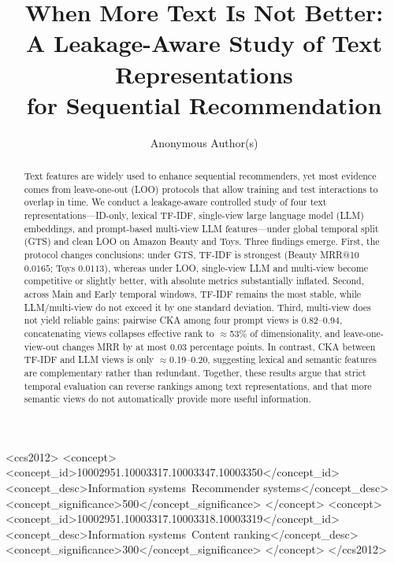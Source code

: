 \documentclass[sigconf,natbib=true,anonymous]{acmart}
\newcommand{\tfidf}{\textsc{TF-IDF}\xspace}
\newcommand{\llm}{\textsc{LLM}\xspace}
\begin{document}
\title{When More Text Is Not Better:\\
A Leakage-Aware Study of Text Representations\\
for Sequential Recommendation}

\author{Anonymous Author(s)}
\renewcommand{\shortauthors}{Anonymous}

\begin{abstract}
Text features are widely used to enhance sequential recommenders, yet most evidence comes from leave-one-out (LOO) protocols that allow training and test interactions to overlap in time.
We conduct a leakage-aware controlled study of four text representations---ID-only, lexical \tfidf, single-view large language model (\llm) embeddings, and prompt-based multi-view \llm features---under global temporal split (GTS) and clean LOO on Amazon Beauty and Toys.
Three findings emerge.
First, the protocol changes conclusions: under GTS, \tfidf is strongest (Beauty MRR@10 $0.0165$; Toys $0.0113$), whereas under LOO, single-view \llm and multi-view become competitive or slightly better, with absolute metrics substantially inflated.
Second, across Main and Early temporal windows, \tfidf remains the most stable, while \llm/multi-view do not exceed it by one standard deviation.
Third, multi-view does not yield reliable gains: pairwise CKA among four prompt views is $0.82$--$0.94$, concatenating views collapses effective rank to $\approx$53\% of dimensionality, and leave-one-view-out changes MRR by at most $0.03$ percentage points.
In contrast, CKA between \tfidf and \llm views is only $\approx$0.19--0.20, suggesting lexical and semantic features are complementary rather than redundant.
Together, these results argue that strict temporal evaluation can reverse rankings among text representations, and that more semantic views do not automatically provide more useful information.
\end{abstract}

\begin{CCSXML}
<ccs2012>
 <concept>
  <concept_id>10002951.10003317.10003347.10003350</concept_id>
  <concept_desc>Information systems~Recommender systems</concept_desc>
  <concept_significance>500</concept_significance>
 </concept>
 <concept>
  <concept_id>10002951.10003317.10003318.10003319</concept_id>
  <concept_desc>Information systems~Content ranking</concept_desc>
  <concept_significance>300</concept_significance>
 </concept>
</ccs2012>
\end{CCSXML}
\end{document}
